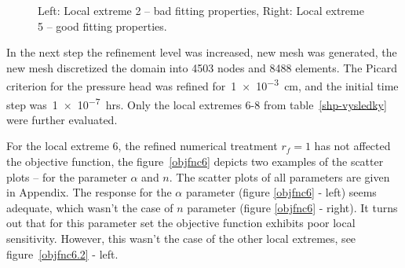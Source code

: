 \documentclass[review,times,3p,twocolumn,10pt]{elsarticle}
\begin{document}
\begin{figure}
\caption{Left: Local extreme 2 -- bad fitting properties, Right: Local extreme 5 -- good fitting properties.}
\label{rf0samples}
\end{figure}

In the next step the refinement level was increased, new mesh was generated, the new mesh discretized the domain into 4503 nodes and 8488 elements. The Picard criterion for the pressure head was refined for~\num{1e-3}~cm, and the initial time step was~\num{1e-7}~hrs. Only the local extremes 6-8 from table~\ref{shp-vysledky} were further evaluated.

For the local extreme 6, the refined numerical treatment $r_f=1$ has not affected the objective function, the figure~\ref{objfnc6} depicts two examples of the scatter plots -- for the parameter $\alpha$ and $n$. The scatter plots of all parameters are given in Appendix. The response for the $\alpha$ parameter (figure \ref{objfnc6} - left) seems adequate, which wasn't the case of $n$ parameter  (figure \ref{objfnc6} - right). It turns out that for this parameter set the objective function exhibits poor local sensitivity. However, this wasn't the case of the other local extremes, see figure~\ref{objfnc6.2} - left. 
\end{document}
